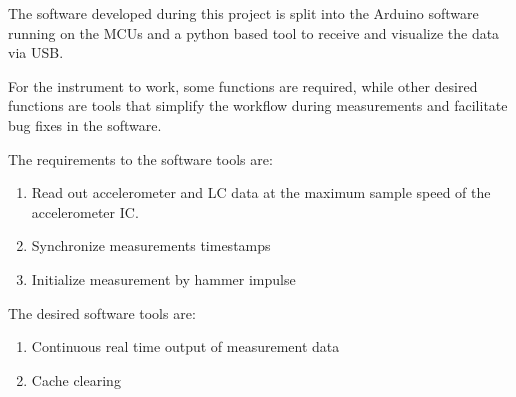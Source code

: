 The software developed during this project is split into the Arduino software running on the \acs{MCU}s and a python based tool to receive and visualize the data via \ac{USB}.

For the instrument to work, some functions are required, while other desired functions are tools that simplify the workflow during measurements and facilitate bug fixes in the software.

The requirements to the software tools are:
\begin{enumerate}[label=\emph{m\arabic*}, itemindent=3em, labelsep=2em]
    \item Read out accelerometer and \ac{LC} data at the maximum sample speed of the accelerometer \ac{IC}. \label{req:read_out}
    \item Synchronize measurements timestamps\label{req:sync}
    \item Initialize measurement by hammer impulse\label{req:init}
\end{enumerate}

The desired software tools are:
\begin{enumerate}[label=\emph{w\arabic*}, itemindent=3em, labelsep=2em]
    \item Continuous real time output of measurement data\label{des:cont_out}
    \item Cache clearing\label{des:cache}
\end{enumerate}


